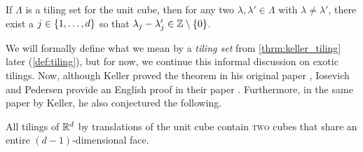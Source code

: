 \documentclass[../thesis.tex]{subfiles}
\begin{document}
\begin{theorem}\label{thrm:keller_tiling}
    If $\Lambda$ is a tiling set for the unit cube, then for any two $\lambda, \lambda' \in \Lambda$ with $\lambda\neq\lambda'$, there exist a $j\in \{1,\dots,d\}$ so that $\lambda_j-\lambda_j' \in \mathbb{Z}\setminus\{0\}$.
\end{theorem}

We will formally define what we mean by a \emph{tiling set} from \cref{thrm:keller_tiling} later (\cref{def:tiling}), but for now, we continue this informal discussion on exotic tilings. Now, although Keller proved the theorem in his original paper \cite{kellerUberLuckenloseErfullung1930}, Iosevich and Pedersen provide an English proof in their paper \cite{iosevichSpectralTilingProperties1998}. Furthermore, in the same paper by Keller, he also conjectured the following. 

\begin{conjecture}\label{conj:keller_tiling}
    All tilings of $\mathbb{R}^d$ by translations of the unit cube contain \textsc{two} cubes that share an entire $(d-1)$-dimensional face.
\end{conjecture}  %


\end{document}
